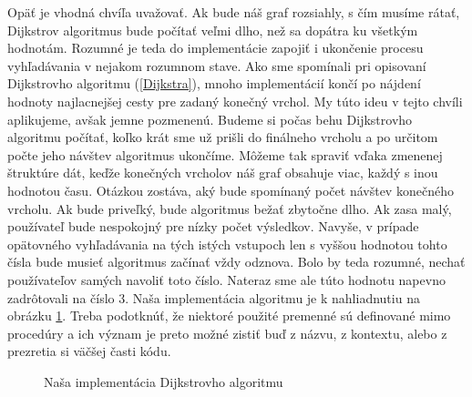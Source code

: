 Opäť je vhodná chvíľa uvažovať. Ak bude náš graf rozsiahly, s čím musíme rátať, Dijkstrov algoritmus bude počítať veľmi dlho, než sa dopátra ku všetkým hodnotám. Rozumné je teda do implementácie zapojiť i ukončenie procesu vyhľadávania v nejakom rozumnom stave. Ako sme spomínali pri opisovaní Dijkstrovho algoritmu (\ref{Dijkstra}), mnoho implementácií končí po nájdení hodnoty najlacnejšej cesty pre zadaný konečný vrchol. My túto ideu v tejto chvíli aplikujeme, avšak jemne pozmenenú. Budeme si počas behu Dijkstrovho algoritmu počítať, koľko krát sme už prišli do finálneho vrcholu a po určitom počte jeho návštev algoritmus ukončíme. Môžeme tak spraviť vďaka zmenenej štruktúre dát, keďže konečných vrcholov náš graf obsahuje viac, každý s inou hodnotou času. Otázkou zostáva, aký bude spomínaný počet návštev konečného vrcholu. Ak bude priveľký, bude algoritmus bežať zbytočne dlho. Ak zasa malý, používateľ bude nespokojný pre nízky počet výsledkov. Navyše, v prípade opätovného vyhľadávania na tých istých vstupoch len s vyššou hodnotou tohto čísla bude musieť algoritmus začínať vždy odznova. Bolo by teda rozumné, nechať používateľov samých navoliť toto číslo. Nateraz sme ale túto hodnotu napevno zadrôtovali na číslo $3$. Naša implementácia algoritmu je k nahliadnutiu na obrázku \ref{Dijsktra_obr2}. Treba podotknúť, že niektoré použité premenné sú definované mimo procedúry a ich význam je preto možné zistiť buď z názvu, z kontextu, alebo z prezretia si väčšej časti kódu.\newline

\begin{figure}[H]
\caption{Naša implementácia Dijkstrovho algoritmu}
\label{Dijsktra_obr2}
\end{figure}

